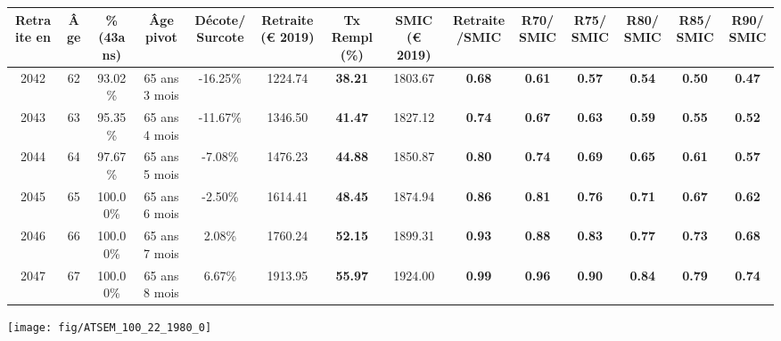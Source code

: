 \begin{adjustbox}{max width=\textwidth} 
\begin{tabular}[htb]{|c|c||c|c|c||c|c||c|c||c|c|c|c|c|} 
\hline 
 Retraite en &  Âge &  \%(43ans) &  Âge pivot &  Décote/Surcote &  Retraite (\euro{} 2019) &  Tx Rempl(\%) &  SMIC (\euro{} 2019) &  Retraite/SMIC &  R70/SMIC &  R75/SMIC &  R80/SMIC &  R85/SMIC &  R90/SMIC \\ 
\hline \hline 
 2042 &  62 &  93.02\% &  65 ans 3 mois &  -16.25\% &  1224.74 &  {\bf 38.21} &  1803.67 &  {\bf {\color{red} 0.68}} &  {\bf {\color{red} 0.61}} &  {\bf {\color{red} 0.57}} &  {\bf {\color{red} 0.54}} &  {\bf {\color{red} 0.50}} &  {\bf {\color{red} 0.47}} \\ 
\hline 
 2043 &  63 &  95.35\% &  65 ans 4 mois &  -11.67\% &  1346.50 &  {\bf 41.47} &  1827.12 &  {\bf {\color{red} 0.74}} &  {\bf {\color{red} 0.67}} &  {\bf {\color{red} 0.63}} &  {\bf {\color{red} 0.59}} &  {\bf {\color{red} 0.55}} &  {\bf {\color{red} 0.52}} \\ 
\hline 
 2044 &  64 &  97.67\% &  65 ans 5 mois &  -7.08\% &  1476.23 &  {\bf 44.88} &  1850.87 &  {\bf {\color{red} 0.80}} &  {\bf {\color{red} 0.74}} &  {\bf {\color{red} 0.69}} &  {\bf {\color{red} 0.65}} &  {\bf {\color{red} 0.61}} &  {\bf {\color{red} 0.57}} \\ 
\hline 
 2045 &  65 &  100.00\% &  65 ans 6 mois &  -2.50\% &  1614.41 &  {\bf 48.45} &  1874.94 &  {\bf {\color{red} 0.86}} &  {\bf {\color{red} 0.81}} &  {\bf {\color{red} 0.76}} &  {\bf {\color{red} 0.71}} &  {\bf {\color{red} 0.67}} &  {\bf {\color{red} 0.62}} \\ 
\hline 
 2046 &  66 &  100.00\% &  65 ans 7 mois &  2.08\% &  1760.24 &  {\bf 52.15} &  1899.31 &  {\bf {\color{red} 0.93}} &  {\bf {\color{red} 0.88}} &  {\bf {\color{red} 0.83}} &  {\bf {\color{red} 0.77}} &  {\bf {\color{red} 0.73}} &  {\bf {\color{red} 0.68}} \\ 
\hline 
 2047 &  67 &  100.00\% &  65 ans 8 mois &  6.67\% &  1913.95 &  {\bf 55.97} &  1924.00 &  {\bf {\color{red} 0.99}} &  {\bf {\color{red} 0.96}} &  {\bf {\color{red} 0.90}} &  {\bf {\color{red} 0.84}} &  {\bf {\color{red} 0.79}} &  {\bf {\color{red} 0.74}} \\ 
\hline 
\hline 
\end{tabular} 
\end{adjustbox} 
 
 \vspace{0.1cm} 

 {\hspace{-2.2cm}\texttt{[image: fig/ATSEM\_100\_22\_1980\_0]}} 

